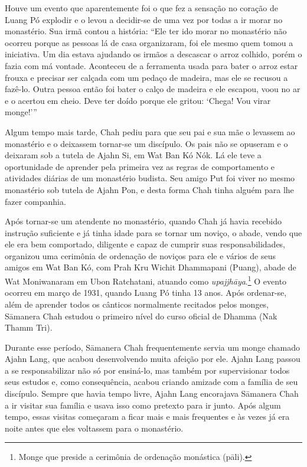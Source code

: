 Houve um evento que aparentemente foi o que fez a sensação no coração de
Luang Pó explodir e o levou a decidir-se de uma vez por todas a ir morar
no monastério. Sua irmã contou a história: ``Ele ter ido morar no
monastério não ocorreu porque as pessoas lá de casa organizaram, foi ele
mesmo quem tomou a iniciativa. Um dia estava ajudando os irmãos a
descascar o arroz colhido, porém o fazia com má vontade. Aconteceu de a
ferramenta usada para bater o arroz estar frouxa e precisar ser calçada
com um pedaço de madeira, mas ele se recusou a fazê-lo. Outra pessoa
então foi bater o calço de madeira e ele escapou, voou no ar e o acertou
em cheio. Deve ter doído porque ele gritou: `Chega! Vou virar monge!'\thinspace ''

Algum tempo mais tarde, Chah pediu para que seu pai e sua mãe o levassem
ao monastério e o deixassem tornar-se um discípulo. Os pais não se
opuseram e o deixaram sob a tutela de Ajahn Si, em Wat Ban Kó Nók. Lá
ele teve a oportunidade de aprender pela primeira vez as regras de
comportamento e atividades diárias de um monastério budista. Seu amigo
Put foi viver no mesmo monastério sob tutela de Ajahn Pon, e desta forma
Chah tinha alguém para lhe fazer companhia.

Após tornar-se um atendente no monastério, quando Chah já havia recebido
instrução suficiente e já tinha idade para se tornar um noviço, o abade,
vendo que ele era bem comportado, diligente e capaz de cumprir suas
responsabilidades, organizou uma cerimônia de ordenação de noviços para
ele e vários de seus amigos em Wat Ban Kó, com Prah Kru Wichit
Dhammapani (Puang), abade de Wat Moniwanaram em Ubon Ratchatani, atuando
como \emph{upajjhāya}.\footnote{Monge que preside a cerimônia de
  ordenação monástica (pāli).} O evento ocorreu em março de
1931, quando Luang Pó tinha 13 anos. Após ordenar-se, além de aprender
todos os cânticos normalmente recitados pelos monges, Sāmanera Chah
estudou o primeiro nível do curso oficial de Dhamma (Nak Thamm
Tri).

Durante esse período, Sāmanera Chah frequentemente servia um monge
chamado Ajahn Lang, que acabou desenvolvendo muita afeição por ele.
Ajahn Lang passou a se responsabilizar não só por ensiná-lo, mas também
por supervisionar todos seus estudos e, como consequência, acabou
criando amizade com a família de seu discípulo. Sempre que havia tempo
livre, Ajahn Lang encorajava Sāmanera Chah a ir visitar sua família e
usava isso como pretexto para ir junto. Após algum tempo, essas visitas
começaram a ficar mais e mais frequentes e às vezes já era noite antes
que eles voltassem para o monastério.

